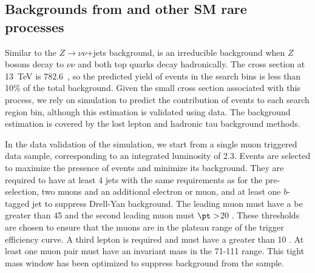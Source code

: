 \subsection{\texorpdfstring{Backgrounds from \ttbarZ and other SM rare processes}%
{Backgrounds from ttZ and other SM rare processes}}
\label{sec:ttZ}

Similar to the $Z\rightarrow\nu\nu$+jets background, \ttbarZ is an irreducible background when $Z$ bosons decay to $\nu \nu$ and both top quarks decay hadronically. 
%
The \ttbarZ cross section at 13~TeV is 782.6~\pb, so the predicted yield of \ttbarZ events in the search bins is less than 10\% of the total background. 
%
Given the small cross section associated with this process, we rely on simulation to predict the contribution of \ttbarZ events to each search region bin, although this estimation is validated using data.
%
The \ttbarW background estimation is covered by the lost lepton and hadronic tau background methods. 

%

In the data validation of the \ttbarZ simulation, we start from a single muon triggered data sample, corresponding to an integrated luminosity of 2.3\ifb. 
%
Events are selected to maximize the presence of \ttbarZ events and minimize its background. 
%
They are required to have at least 4 jets with the same \pt requirements as for the pre-selection, two muons and an additional electron or muon, and at least one $b$-tagged jet to suppress Drell-Yan background.  
%
The leading muon must have a \pt be greater than 45 \gev and the second leading muon must $\pt>$20 \gev. 
%
These thresholds are chosen to ensure that the muons are in the plateau range of the trigger efficiency curve.  
%
A third lepton is required and must have a \pt greater than 10 \gev. 
%
At least one muon pair must have an invariant mass in the 71-111 \gev range. 
%
This tight mass window has been optimized to suppress \ttbar
background from the \ttbarZ sample. 

